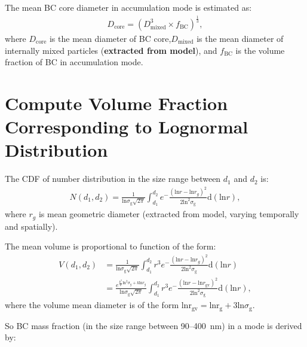 \documentclass[11pt]{article}
\begin{document}
\bigskip
\noindent The mean BC core diameter in accumulation mode is estimated as:
\begin{align*}
D_{\text{core}} = (D_{\text{mixed}}^3 \times f_{\text{BC}})^\frac{1}{3}, 
\end{align*}
where $D_{\text{core}}$ is the mean diameter of BC core,$D_{\text{mixed}}$ is the mean diameter of internally mixed particles (\textbf{extracted from model}), and $f_{\text{BC}}$ is the volume fraction of BC in accumulation mode.



 
\section{Compute Volume Fraction Corresponding to Lognormal Distribution}
The CDF of number distribution in the size range between $d_{1}$ and $d_{2}$ is:
\begin{align*}
N(d_{1}, d_{2}) = \frac{1}{\text{ln}\sigma_{\text{g}}\sqrt{2\pi}}\int_{d_{1}}^{d_{2}}e^-\frac{(\text{ln}r - \text{ln}r_{g})^2}{2\text{ln}^2\sigma_{\text{g}}}\text{d}(\text{ln}r),
\end{align*}
where $r_{g}$ is mean geometric diameter (extracted from model, varying temporally and spatially). 

\noindent The mean volume is proportional to function of the form:
\begin{align*}
V(d_{1}, d_{2}) &= \frac{1}{\text{ln}\sigma_{\text{g}}\sqrt{2\pi}}\int_{d_{1}}^{d_{2}}r^3e^-\frac{(\text{ln}r - \text{ln}r_{g})^2}{2\text{ln}^2\sigma_{\text{g}}}\text{d}(\text{ln}r)  \\
&=\frac{e^{\frac{k^2}{2}\text{ln}^2\sigma_{g}+k\text{ln}r_{g}}}{\text{ln}\sigma_{\text{g}}\sqrt{2\pi}}\int_{d_{1}}^{d_{2}}r^3e^-\frac{(\text{ln}r - \text{ln}r_{\text{gv}})^2}{2\text{ln}^2\sigma_{\text{g}}}\text{d}(\text{ln}r),
\end{align*}
where the volume mean diameter is of the form $\text{lnr}_{\text{gv}} = \text{lnr}_{\text{g}} + 3\text{ln}\sigma_{\text{g}}$.

\noindent So BC mass fraction (in the size range between 90--400~nm) in a mode is derived by:
\end{document}
